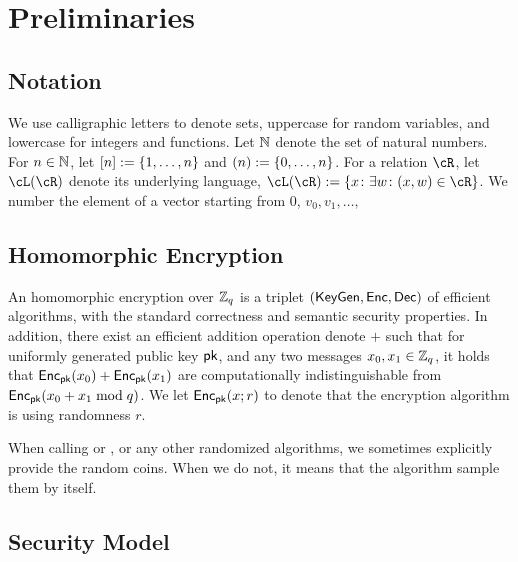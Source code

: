 \section{Preliminaries}\label{sec:Preliminaries}

\subsection{Notation} 
We use calligraphic letters to denote sets, uppercase for random variables, and lowercase for integers and functions. %
Let ${\mathbb{N}}$ denote the set of natural numbers.  For $n\in {\mathbb{N}}$, let $[n] \eqdef \set{1,\ldots,n}$ and $(n) \eqdef \set{0,\ldots,n}$.  For a relation $\cR$, let $\cL(\cR)$ denote its underlying language, \ie  $\cL(\cR) \eqdef \set{x\colon \exists w \colon (x,w) \in \cR}$.    We number the element of a vector starting from $0$, \ie $v_0,v_1,
\ldots,$


\subsection{Homomorphic Encryption}
An homomorphic encryption over ${\mathbb Z}_q$ is a triplet $(\mathsf{KeyGen},\mathsf{Enc},\mathsf{Dec})$ of efficient algorithms, with the standard correctness and semantic security properties.  In addition, there exist an efficient  addition operation denote $+$  such that for uniformly  generated public key  ${\mathsf{pk}}$, and any two  messages $x_0,x_1\in {\mathbb Z}_q$,  it holds that  $\mathsf{Enc}_{\mathsf{pk}}(x_0) + \mathsf{Enc}_{\mathsf{pk}}(x_1) $ are computationally indistinguishable from $\mathsf{Enc}_{\mathsf{pk}}(x_0+ x_1 \bmod q)$. We let $\mathsf{Enc}_{\mathsf{pk}}(x;r)$ to denote that the encryption algorithm is using randomness $r$. 

\begin{remark}
When calling  \KeyGen or \Enc, or any other randomized algorithms,  we sometimes explicitly provide the random coins. When we do not, it means that the algorithm sample them by itself. 
\end{remark}


\subsection{Security Model}



